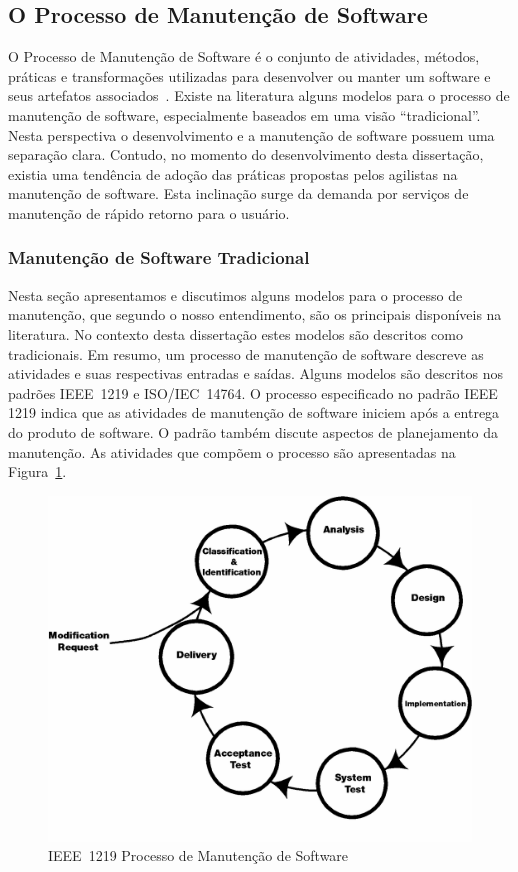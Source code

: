 \subsection{O Processo de Manutenção de Software}
\label{sec:o_processo_de_manutecao_de_software}

O Processo de Manutenção de Software é o conjunto de atividades, métodos,
práticas e transformações utilizadas para desenvolver ou manter um software e
seus artefatos associados~\cite{paulk1993key}. Existe na literatura alguns
modelos para o processo de manutenção de software, especialmente baseados em uma
visão ``tradicional''. Nesta perspectiva o desenvolvimento e a manutenção de
software possuem uma separação clara. Contudo, no momento do desenvolvimento
desta dissertação, existia uma tendência de adoção das práticas propostas pelos
agilistas na manutenção de software. Esta inclinação surge da demanda por
serviços de manutenção de rápido retorno para o usuário.


\subsubsection{Manutenção de Software Tradicional}
\label{subsec:manutenção_de_software_tradicional}

Nesta seção apresentamos e discutimos alguns modelos para o processo de
manutenção, que segundo o nosso entendimento, são os principais disponíveis na
literatura. No contexto desta dissertação estes modelos são descritos como
tradicionais. Em resumo, um processo de manutenção de software descreve as
atividades e suas respectivas entradas e saídas. Alguns modelos são descritos
nos padrões IEEE~1219 e ISO/IEC~14764. O processo especificado no padrão IEEE
1219 indica que as atividades de manutenção de software iniciem após a entrega
do produto de software. O padrão também discute aspectos de planejamento da
manutenção. As atividades que compõem o processo são apresentadas na
Figura~\ref{fig:ieee-1219-processo-man-software}.

\begin{figure}[htpb] \centering
    \includegraphics[width=0.5\linewidth]{./chapter-manutencao-software-visao-geral/img/ieee_1219_98_processo_manutencao.png}
	\caption{IEEE~1219 Processo de Manutenção de
		Software}\label{fig:ieee-1219-processo-man-software}
\end{figure}

